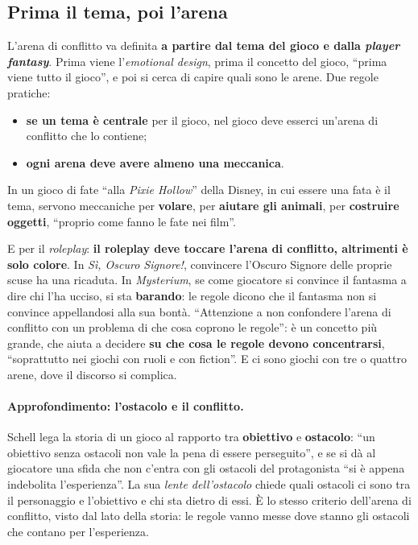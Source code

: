 \subsection{Prima il tema, poi l'arena}



L'arena di conflitto va definita \textbf{a partire dal tema del gioco e dalla \emph{player
fantasy}}. Prima viene l'\emph{emotional design}, prima il concetto del gioco, ``prima viene tutto
il gioco'', e poi si cerca di capire quali sono le arene. Due regole pratiche:
\begin{itemize}
  \item \textbf{se un tema è centrale} per il gioco, nel gioco deve esserci un'arena di conflitto
        che lo contiene;
  \item \textbf{ogni arena deve avere almeno una meccanica}.
\end{itemize}
In un gioco di fate ``alla \emph{Pixie Hollow}'' della Disney, in cui essere una fata è il tema,
servono meccaniche per \textbf{volare}, per \textbf{aiutare gli animali}, per \textbf{costruire
oggetti}, ``proprio come fanno le fate nei film''.

E per il \emph{roleplay}: \textbf{il roleplay deve toccare l'arena di conflitto, altrimenti è solo
colore}. In \emph{Sì, Oscuro Signore!}, convincere l'Oscuro Signore delle proprie scuse ha una
ricaduta. In \emph{Mysterium}, se come giocatore si convince il fantasma a dire chi l'ha ucciso, si
sta \textbf{barando}: le regole dicono che il fantasma non si convince appellandosi alla sua bontà.
``Attenzione a non confondere l'arena di conflitto con un problema di che cosa coprono le regole'':
è un concetto più grande, che aiuta a decidere \textbf{su che cosa le regole devono
concentrarsi}, ``soprattutto nei giochi con ruoli e con fiction''. E ci sono giochi con tre o
quattro arene, dove il discorso si complica.

\paragraph{Approfondimento: l'ostacolo e il conflitto.} Schell lega la storia di un gioco al
rapporto tra \textbf{obiettivo} e \textbf{ostacolo}: ``un obiettivo senza ostacoli non vale la pena
di essere perseguito'', e se si dà al giocatore una sfida che non c'entra con gli ostacoli del
protagonista ``si è appena indebolita l'esperienza''. La sua \emph{lente dell'ostacolo} chiede
quali ostacoli ci sono tra il personaggio e l'obiettivo e chi sta dietro di essi. È lo stesso
criterio dell'arena di conflitto, visto dal lato della storia: le regole vanno messe dove stanno
gli ostacoli che contano per l'esperienza.

